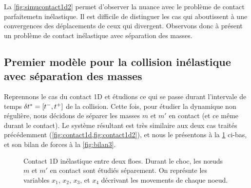 \noindent La \cref{fig:simucontact1d2} permet d'observer la nuance avec le problème de contact parfaitemetn inélastique. Il est difficile de distinguer les cas qui aboutissent à une convergences des déplacements de ceux qui divergent. Observons donc à présent un problème de contact inélastique avec séparation des masses.






\subsection{Premier modèle pour la collision inélastique avec séparation des masses}
\label{subsubsec:colinesepma}

Reprennons le cas du contact 1D et étudions ce qui se passe durant l'intervale de temps $\delta t^{*} = [t^{-}, t^{+}]$ de la collision. Cette fois, pour étudier la dynamique non régulière, nous décidons de séparer les masses $m$ et $m'$ en contact (et ce même durant le contact). Le système résultant est très similaire aux deux cas traités précédemment (\cref{fig:contact1d,fig:contact1d2}), et nous le présentons à la \cref{fig:contact1d3} ci-bas, et son bilan de forces à la \cref{fig:bilan3}.

\begin{figure}[!h]
    \centering
    \caption{Contact 1D inélastique entre deux floes. Durant le choc, les nœuds $m$ et $m'$ en contact sont étudiés séparement. On représnte les variables $x_1$, $x_2$, $x_3$, et $x_4$ décrivant les movements de chaque noeud.}
    \label{fig:contact1d3}
\end{figure}


